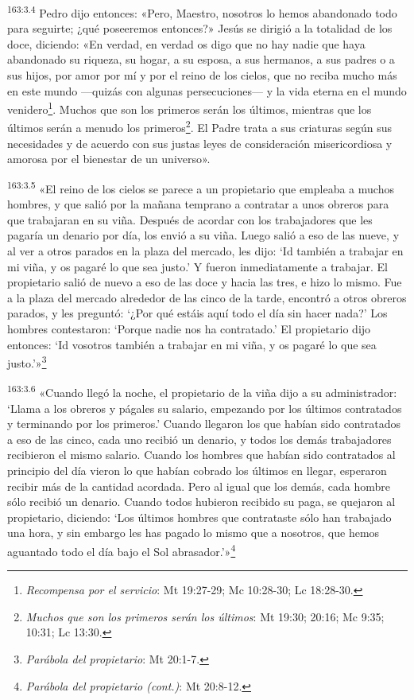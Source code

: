 \par
\textsuperscript{163:3.4} Pedro dijo entonces: «Pero, Maestro, nosotros lo hemos abandonado todo para seguirte; ¿qué poseeremos entonces?» Jesús se dirigió a la totalidad de los doce, diciendo: «En verdad, en verdad os digo que no hay nadie que haya abandonado su riqueza, su hogar, a su esposa, a sus hermanos, a sus padres o a sus hijos, por amor por mí y por el reino de los cielos, que no reciba mucho más en este mundo ---quizás con algunas persecuciones--- y la vida eterna en el mundo venidero\footnote{\textit{Recompensa por el servicio}: Mt 19:27-29; Mc 10:28-30; Lc 18:28-30.}. Muchos que son los primeros serán los últimos, mientras que los últimos serán a menudo los primeros\footnote{\textit{Muchos que son los primeros serán los últimos}: Mt 19:30; 20:16; Mc 9:35; 10:31; Lc 13:30.}. El Padre trata a sus criaturas según sus necesidades y de acuerdo con sus justas leyes de consideración misericordiosa y amorosa por el bienestar de un universo».

\par
\textsuperscript{163:3.5} «El reino de los cielos se parece a un propietario que empleaba a muchos hombres, y que salió por la mañana temprano a contratar a unos obreros para que trabajaran en su viña. Después de acordar con los trabajadores que les pagaría un denario por día, los envió a su viña. Luego salió a eso de las nueve, y al ver a otros parados en la plaza del mercado, les dijo: `Id también a trabajar en mi viña, y os pagaré lo que sea justo.' Y fueron inmediatamente a trabajar. El propietario salió de nuevo a eso de las doce y hacia las tres, e hizo lo mismo. Fue a la plaza del mercado alrededor de las cinco de la tarde, encontró a otros obreros parados, y les preguntó: `¿Por qué estáis aquí todo el día sin hacer nada?' Los hombres contestaron: `Porque nadie nos ha contratado.' El propietario dijo entonces: `Id vosotros también a trabajar en mi viña, y os pagaré lo que sea justo.'»\footnote{\textit{Parábola del propietario}: Mt 20:1-7.}

\par
\textsuperscript{163:3.6} «Cuando llegó la noche, el propietario de la viña dijo a su administrador: `Llama a los obreros y págales su salario, empezando por los últimos contratados y terminando por los primeros.' Cuando llegaron los que habían sido contratados a eso de las cinco, cada uno recibió un denario, y todos los demás trabajadores recibieron el mismo salario. Cuando los hombres que habían sido contratados al principio del día vieron lo que habían cobrado los últimos en llegar, esperaron recibir más de la cantidad acordada. Pero al igual que los demás, cada hombre sólo recibió un denario. Cuando todos hubieron recibido su paga, se quejaron al propietario, diciendo: `Los últimos hombres que contrataste sólo han trabajado una hora, y sin embargo les has pagado lo mismo que a nosotros, que hemos aguantado todo el día bajo el Sol abrasador.'»\footnote{\textit{Parábola del propietario (cont.)}: Mt 20:8-12.}

